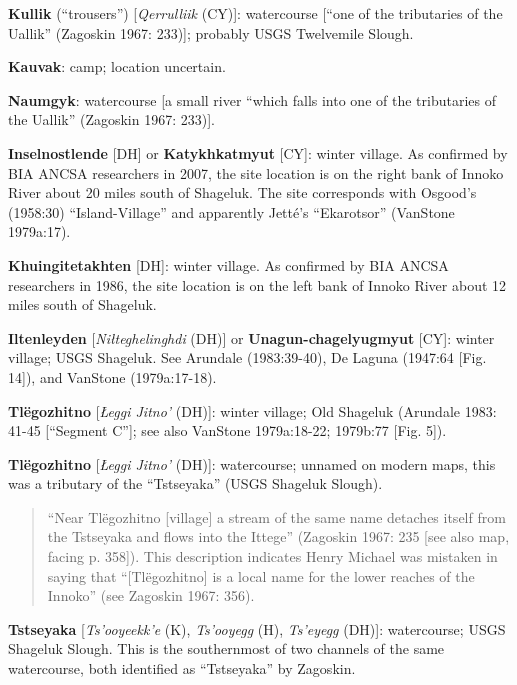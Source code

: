 \begin{hang}
\textbf{Kullik} (“trousers”) [\textit{Qerrulliik} (CY)]: watercourse [“one of the tributaries of the Uallik” (Zagoskin 1967: 233)]; probably USGS Twelvemile Slough.



\textbf{Kauvak}: camp; location uncertain.



\textbf{Naumgyk}: watercourse [a small river “which falls into one of the tributaries of the Uallik” (Zagoskin 1967: 233)].



\textbf{Inselnostlende} [DH] or \textbf{Katykhkatmyut} [CY]: winter village. As confirmed by BIA ANCSA researchers in 2007, the site location is on the right bank of Innoko River about 20 miles south of Shageluk. The site corresponds with Osgood’s (1958:30) “Island-Village” and apparently Jetté’s “Ekarotsor” (VanStone 1979a:17).



\textbf{Khuingitetakhten} [DH]: winter village. As confirmed by BIA ANCSA researchers in 1986, the site location is on the left bank of Innoko River about 12 miles south of Shageluk.



\textbf{Iltenleyden} [\textit{Niłteghelinghdi} (DH)] or \textbf{Unagun-chagelyugmyut} [CY]: winter village; USGS Shageluk. See Arundale (1983:39-40), De Laguna (1947:64 [Fig. 14]), and VanStone (1979a:17-18).



\textbf{Tlëgozhitno} [\textit{Łeggi Jitno’} (DH)]: winter village; Old Shageluk (Arundale 1983: 41-45 [“Segment C”]; see also VanStone 1979a:18-22; 1979b:77 [Fig. 5]).



\textbf{Tlëgozhitno} [\textit{Łeggi Jitno’} (DH)]: watercourse; unnamed on modern maps, this was a tributary of the “Tstseyaka” (USGS Shageluk Slough).



\begin{quote}
“Near Tlëgozhitno [village] a stream of the same name detaches itself from the Tstseyaka and flows into the Ittege” (Zagoskin 1967: 235 [see also map, facing p. 358]). This description indicates Henry Michael was mistaken in saying that “[Tlëgozhitno] is a local name for the lower reaches of the Innoko” (see Zagoskin 1967: 356).
\end{quote}



\textbf{Tstseyaka} [\textit{Ts’ooyeekk’e} (K), \textit{Ts’ooyegg} (H), \textit{Ts’eyegg} (DH)]: watercourse; USGS Shageluk Slough. This is the southernmost of two channels of the same watercourse, both identified as “Tstseyaka” by Zagoskin.




\end{hang}
